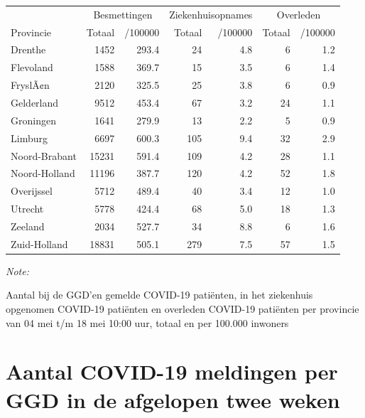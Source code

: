 \documentclass[
  english,
  man,floatsintext]{apa6}
\begin{document}
\begin{table}
\centering
\begin{threeparttable}
\begin{tabular}{lrrrrrr}
\toprule
\multicolumn{1}{c}{ } & \multicolumn{2}{c}{Besmettingen} & \multicolumn{2}{c}{Ziekenhuisopnames} & \multicolumn{2}{c}{Overleden} \\
\cmidrule(l{3pt}r{3pt}){2-3} \cmidrule(l{3pt}r{3pt}){4-5} \cmidrule(l{3pt}r{3pt}){6-7}
Provincie & Totaal & /100000 & Totaal & /100000 & Totaal & /100000\\
\midrule
Drenthe & 1452 & 293.4 & 24 & 4.8 & 6 & 1.2\\
Flevoland & 1588 & 369.7 & 15 & 3.5 & 6 & 1.4\\
FryslÃ¢n & 2120 & 325.5 & 25 & 3.8 & 6 & 0.9\\
Gelderland & 9512 & 453.4 & 67 & 3.2 & 24 & 1.1\\
Groningen & 1641 & 279.9 & 13 & 2.2 & 5 & 0.9\\
Limburg & 6697 & 600.3 & 105 & 9.4 & 32 & 2.9\\
Noord-Brabant & 15231 & 591.4 & 109 & 4.2 & 28 & 1.1\\
Noord-Holland & 11196 & 387.7 & 120 & 4.2 & 52 & 1.8\\
Overijssel & 5712 & 489.4 & 40 & 3.4 & 12 & 1.0\\
Utrecht & 5778 & 424.4 & 68 & 5.0 & 18 & 1.3\\
Zeeland & 2034 & 527.7 & 34 & 8.8 & 6 & 1.6\\
Zuid-Holland & 18831 & 505.1 & 279 & 7.5 & 57 & 1.5\\
\bottomrule
\end{tabular}
\begin{tablenotes}
\item \textit{Note: } 
\item Aantal bij de GGD’en gemelde COVID-19 patiënten, in het ziekenhuis opgenomen COVID-19 patiënten en overleden COVID-19 patiënten per provincie van 04 mei t/m 18 mei 10:00 uur, totaal en per 100.000 inwoners
\end{tablenotes}
\end{threeparttable}
\end{table}

\newpage

\hypertarget{aantal-covid-19-meldingen-per-ggd-in-de-afgelopen-twee-weken}{%
\section{Aantal COVID-19 meldingen per GGD in de afgelopen twee weken}\label{aantal-covid-19-meldingen-per-ggd-in-de-afgelopen-twee-weken}}
\end{document}

